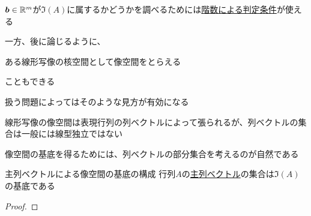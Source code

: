 \documentclass[../../../topic_linear-algebra]{subfiles}
\begin{document}
$\vb*{b} \in \mathbb{R}^m$が$\Im(A)$に属するかどうかを調べるためには\hyperref[thm:augmented-rank-solution-condition]{階数による判定条件}が使える

\sectionline

一方、後に論じるように、
\begin{shaded}
  ある線形写像の核空間として像空間をとらえる
\end{shaded}
こともできる

扱う問題によってはそのような見方が有効になる

\sectionline

線形写像の像空間は表現行列の列ベクトルによって張られるが、列ベクトルの集合は一般には線型独立ではない

像空間の基底を得るためには、列ベクトルの部分集合を考えるのが自然である

\begin{theorem}{主列ベクトルによる像空間の基底の構成}\label{thm:pivot-cols-form-basis}
  行列$A$の\hyperref[def:pivot-columns]{主列ベクトル}の集合は$\Im(A)$の基底である
\end{theorem}

\begin{proof}
\end{proof}
\end{document}
